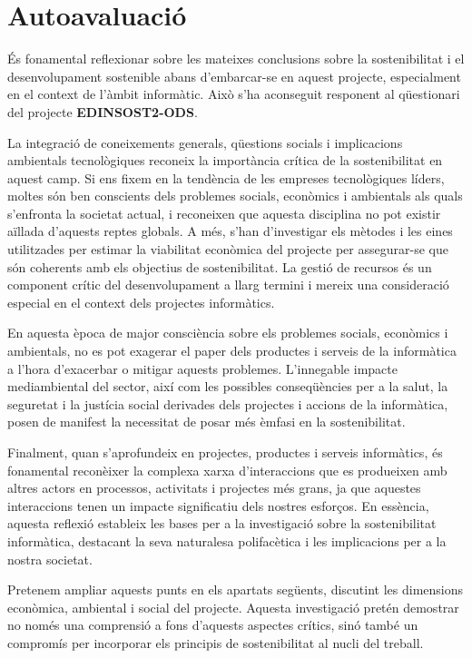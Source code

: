 \section{Autoavaluació}
És fonamental reflexionar sobre les mateixes conclusions sobre la sostenibilitat i el desenvolupament sostenible abans d'embarcar-se en aquest projecte, especialment en el context de l'àmbit informàtic. Això s'ha aconseguit responent al qüestionari del projecte \textbf{EDINSOST2-ODS}.

La integració de coneixements generals, qüestions socials i implicacions ambientals tecnològiques reconeix la importància crítica de la sostenibilitat en aquest camp. Si ens fixem en la tendència de les empreses tecnològiques líders, moltes són ben conscients dels problemes socials, econòmics i ambientals als quals s'enfronta la societat actual, i reconeixen que aquesta disciplina no pot existir aïllada d'aquests reptes globals. A més, s'han d'investigar els mètodes i les eines utilitzades per estimar la viabilitat econòmica del projecte per assegurar-se que són coherents amb els objectius de sostenibilitat. La gestió de recursos és un component crític del desenvolupament a llarg termini i mereix una consideració especial en el context dels projectes informàtics.

En aquesta època de major consciència sobre els problemes socials, econòmics i ambientals, no es pot exagerar el paper dels productes i serveis de la informàtica a l'hora d'exacerbar o mitigar aquests problemes. L'innegable impacte mediambiental del sector, així com les possibles conseqüències per a la salut, la seguretat i la justícia social derivades dels projectes i accions de la informàtica, posen de manifest la necessitat de posar més èmfasi en la sostenibilitat.

Finalment, quan s'aprofundeix en projectes, productes i serveis informàtics, és fonamental reconèixer la complexa xarxa d'interaccions que es produeixen amb altres actors en processos, activitats i projectes més grans, ja que aquestes interaccions tenen un impacte significatiu dels nostres esforços. En essència, aquesta reflexió estableix les bases per a la investigació sobre la sostenibilitat informàtica, destacant la seva naturalesa polifacètica i les implicacions per a la nostra societat.

Pretenem ampliar aquests punts en els apartats següents, discutint les dimensions econòmica, ambiental i social del projecte. Aquesta investigació pretén demostrar no només una comprensió a fons d'aquests aspectes crítics, sinó també un compromís per incorporar els principis de sostenibilitat al nucli del treball.
